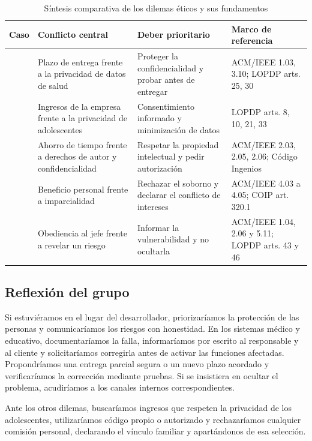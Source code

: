 \documentclass[12pt,a4paper,oneside]{article}
\begin{document}
\begin{table}[H]
\centering
\caption{Síntesis comparativa de los dilemas éticos y sus fundamentos}
\label{tab:sintesis-casos}
\small
{}
\renewcommand{\arraystretch}{1.1}
\begin{tabularx}{\textwidth}{@{}>{\raggedright\arraybackslash}p{1.5cm}>{\raggedright\arraybackslash}X>{\raggedright\arraybackslash}X>{\raggedright\arraybackslash}X@{}}
\toprule
\textbf{Caso} & \textbf{Conflicto central} & \textbf{Deber prioritario} & \textbf{Marco de referencia} \\
\midrule
1 & Plazo de entrega frente a la privacidad de datos de salud & Proteger la confidencialidad y probar antes de entregar & ACM/IEEE 1.03, 3.10; LOPDP arts. 25, 30 \\
2 & Ingresos de la empresa frente a la privacidad de adolescentes & Consentimiento informado y minimización de datos & LOPDP arts. 8, 10, 21, 33 \\
3 & Ahorro de tiempo frente a derechos de autor y confidencialidad & Respetar la propiedad intelectual y pedir autorización & ACM/IEEE 2.03, 2.05, 2.06; Código Ingenios \\
4 & Beneficio personal frente a imparcialidad & Rechazar el soborno y declarar el conflicto de intereses & ACM/IEEE 4.03 a 4.05; COIP art. 320.1 \\
5 & Obediencia al jefe frente a revelar un riesgo & Informar la vulnerabilidad y no ocultarla & ACM/IEEE 1.04, 2.06 y 5.11; LOPDP arts. 43 y 46 \\
\bottomrule
\end{tabularx}
\end{table}

\subsection{Reflexión del grupo}

Si estuviéramos en el lugar del desarrollador, priorizaríamos la protección de las personas y comunicaríamos los riesgos con honestidad. En los sistemas médico y educativo, documentaríamos la falla, informaríamos por escrito al responsable y al cliente y solicitaríamos corregirla antes de activar las funciones afectadas. Propondríamos una entrega parcial segura o un nuevo plazo acordado y verificaríamos la corrección mediante pruebas. Si se insistiera en ocultar el problema, acudiríamos a los canales internos correspondientes.

Ante los otros dilemas, buscaríamos ingresos que respeten la privacidad de los adolescentes, utilizaríamos código propio o autorizado y rechazaríamos cualquier comisión personal, declarando el vínculo familiar y apartándonos de esa selección.
\end{document}
